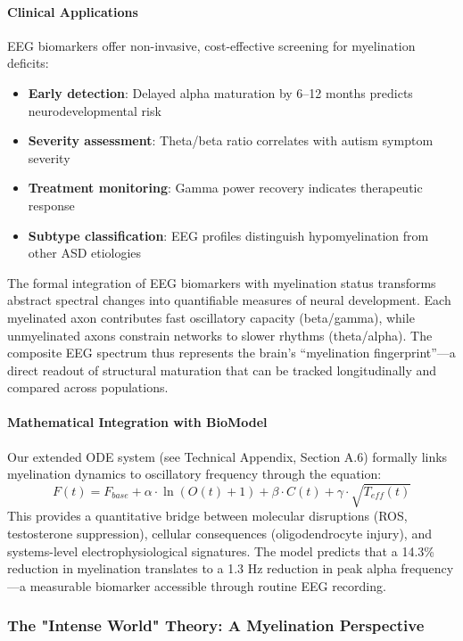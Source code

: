 \documentclass[11pt]{article}
\let\oldsubsubsection\subsubsection
\renewcommand{\subsubsection}[1]{\oldsubsubsection{#1}\setlength{\leftskip}{1.5em}}
\begin{document}
\paragraph{Clinical Applications}
EEG biomarkers offer non-invasive, cost-effective screening for myelination deficits:
\begin{itemize}
\item \textbf{Early detection}: Delayed alpha maturation by 6--12 months predicts neurodevelopmental risk
\item \textbf{Severity assessment}: Theta/beta ratio correlates with autism symptom severity
\item \textbf{Treatment monitoring}: Gamma power recovery indicates therapeutic response
\item \textbf{Subtype classification}: EEG profiles distinguish hypomyelination from other ASD etiologies
\end{itemize}

The formal integration of EEG biomarkers with myelination status transforms abstract spectral changes into quantifiable measures of neural development. Each myelinated axon contributes fast oscillatory capacity (beta/gamma), while unmyelinated axons constrain networks to slower rhythms (theta/alpha). The composite EEG spectrum thus represents the brain's ``myelination fingerprint''—a direct readout of structural maturation that can be tracked longitudinally and compared across populations.

\paragraph{Mathematical Integration with BioModel}
Our extended ODE system (see Technical Appendix, Section A.6) formally links myelination dynamics to oscillatory frequency through the equation:
\[
F(t) = F_{base} + \alpha \cdot \ln(O(t) + 1) + \beta \cdot C(t) + \gamma \cdot \sqrt{T_{eff}(t)}
\]
This provides a quantitative bridge between molecular disruptions (ROS, testosterone suppression), cellular consequences (oligodendrocyte injury), and systems-level electrophysiological signatures. The model predicts that a 14.3\% reduction in myelination translates to a 1.3 Hz reduction in peak alpha frequency—a measurable biomarker accessible through routine EEG recording.

\subsubsection{The "Intense World" Theory: A Myelination Perspective}
\end{document}
